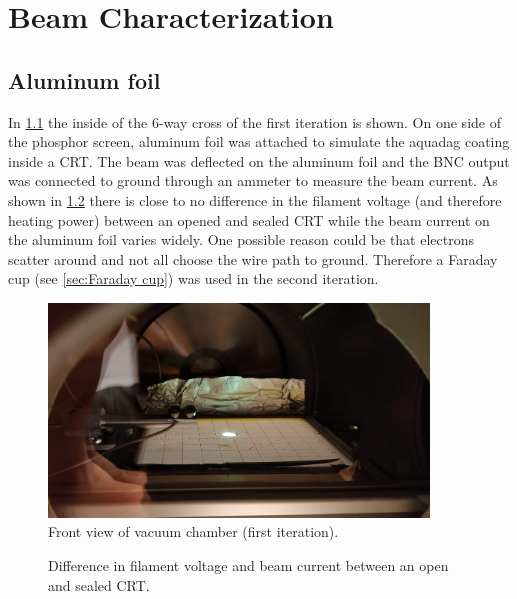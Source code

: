 
\chapter{Beam Characterization}
\label{ch:Beam Characterization}


\section{Aluminum foil}
\label{sec:Aluminum foil}

In \cref{fig:Front view of vacuum chamber (first iteration)} the inside of the 6-way cross of the first iteration is shown. On one side of the phosphor screen, aluminum foil was attached to simulate the aquadag coating inside a CRT. The beam was deflected on the aluminum foil and the BNC output was connected to ground through an ammeter to measure the beam current. As shown in \cref{fig:Difference in filament voltage and beam current between an open and sealed CRT} there is close to no difference in the filament voltage (and therefore heating power) between an opened and sealed CRT while the beam current on the aluminum foil varies widely. One possible reason could be that electrons scatter around and not all choose the wire path to ground. Therefore a Faraday cup (see \cref{sec:Faraday cup}) was used in the second iteration.


\begin{figure}[h]
	\centering
	\includegraphics[width=0.9\textwidth]{./Chapters/beam-characterization/center_image}
	\caption{Front view of vacuum chamber (first iteration).}
	\label{fig:Front view of vacuum chamber (first iteration)}
\end{figure}


\begin{figure}[ht]
	\centering
	
	\begin{tikzpicture}
		
	\end{tikzpicture}
	
	\caption{Difference in filament voltage and beam current between an open and sealed CRT.}
	\label{fig:Difference in filament voltage and beam current between an open and sealed CRT}
\end{figure}

